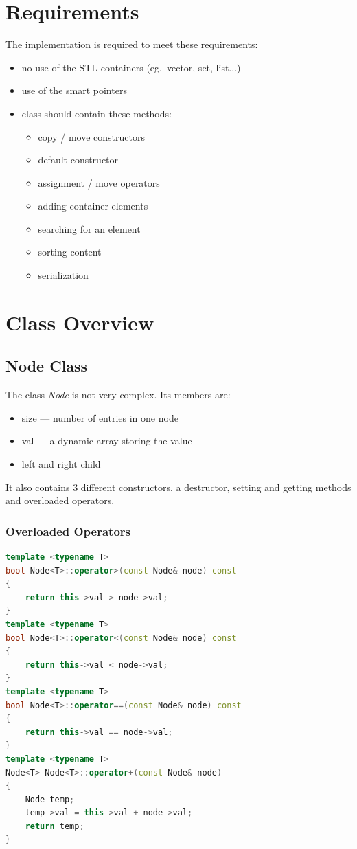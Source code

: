 \documentclass[12pt]{article}
\begin{document}
\pagebreak
\section{Requirements}
The implementation is required to meet these requirements:
\begin{itemize}
    \item no use of the STL containers (eg.\ vector, set, list...)
    \item use of the smart pointers
    \item class should contain these methods:
        \begin{itemize}
            \item copy / move constructors
            \item default constructor
            \item assignment / move operators
            \item adding container elements
            \item searching for an element
            \item sorting content
            \item serialization
        \end{itemize}
\end{itemize}

\section{Class Overview}
\subsection{Node Class}
The class \textit{Node} is not very complex. Its members are:
\begin{itemize}
    \item size --- number of entries in one node
    \item val --- a dynamic array storing the value
    \item left and right child
\end{itemize}

It also contains 3 different constructors, a destructor, setting and getting methods and overloaded operators.

\subsubsection{Overloaded Operators}
\begin{footnotesize}
\begin{lstlisting}[language=C++]
template <typename T>
bool Node<T>::operator>(const Node& node) const
{
    return this->val > node->val;
}
template <typename T>
bool Node<T>::operator<(const Node& node) const
{
    return this->val < node->val;
}
template <typename T>
bool Node<T>::operator==(const Node& node) const
{
    return this->val == node->val;
}
template <typename T>
Node<T> Node<T>::operator+(const Node& node)
{
    Node temp;
    temp->val = this->val + node->val;
    return temp;
}
\end{lstlisting}
\end{footnotesize}
\end{document}
